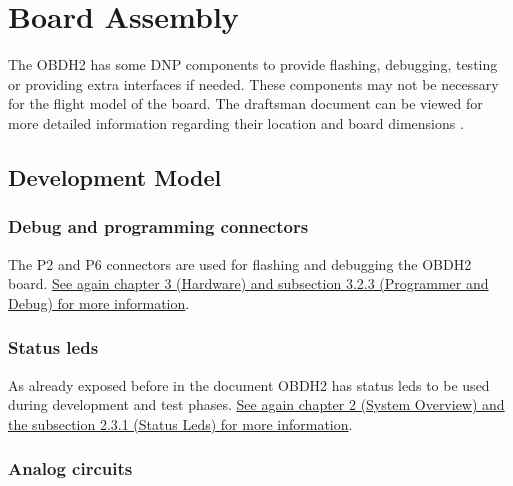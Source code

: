%
%
%
%
%

%
%
%
%
%
%

\chapter{Board Assembly} \label{ch:assembly}

The OBDH2 has some DNP components to provide flashing, debugging, testing or providing extra interfaces if needed. These components may not be necessary for the flight model of the board. The draftsman document can be viewed for more detailed information regarding their location and board dimensions \cite{obdh2-draftsman}.

\section{Development Model}

\subsection{Debug and programming connectors}

The P2 and P6 connectors are used for flashing and debugging the OBDH2 board. \hyperref[sec:programer-and-debug]{See again chapter 3 (Hardware) and subsection 3.2.3 (Programmer and Debug) for more information}.

\subsection{Status leds}

As already exposed before in the document OBDH2 has status leds to be used during development and test phases. \hyperref[sec:status-leds]{See again chapter 2 (System Overview) and the subsection 2.3.1 (Status Leds) for more information}.

\subsection{Analog circuits}


